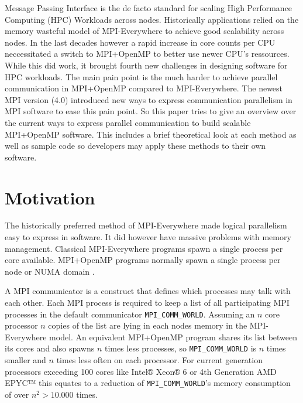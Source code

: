 \documentclass[sigconf]{acmart}
\begin{document}
Message Passing Interface is the de facto standard for scaling High Performance Computing (HPC) Workloads across nodes.
Historically applications relied on the memory wasteful model of MPI-Everywhere to achieve good scalability across nodes.
In the last decades however a rapid increase in core counts per CPU neccessitated a switch to MPI+OpenMP to better use newer CPU's ressources.
While this did work, it brought fourth new challenges in designing software for HPC workloads.
The main pain point is the much harder to achieve parallel communication in MPI+OpenMP compared to MPI-Everywhere.
The newest MPI version (4.0) introduced new ways to express communication parallelism in MPI software to ease this pain point.
So this paper tries to give an overview over the current ways to express parallel communication to build scalable MPI+OpenMP software.
This includes a brief theoretical look at each method as well as sample code so developers may apply these methods to their own software.



\section{Motivation}
The historically preferred method of MPI-Everywhere made logical parallelism easy to express in software.
It did however have massive problems with memory management.
Classical MPI-Everywhere programs spawn a single process per core available.
MPI+OpenMP programs normally spawn a single process per node or NUMA domain \cite{zambreLessonsLearned2022}.

A MPI communicator is a construct that defines which processes may talk with each other.
Each MPI process is required to keep a list of all participating MPI processes in the default communicator \verb|MPI_COMM_WORLD|.
Assuming an $n$ core processor $n$ copies of the list are lying in each nodes memory in the MPI-Everywhere model.
An equivalent MPI+OpenMP program shares its list between its cores and also spawns $n$ times less processes, so \verb|MPI_COMM_WORLD| is $n$ times smaller and $n$ times less often on each processor.
For current generation processors exceeding 100 cores like Intel® Xeon® 6 \cite{intelXeon6} or 4th Generation AMD EPYC™ \cite{amd4thGenEpyc} this equates to a reduction of \verb|MPI_COMM_WORLD|'s memory consumption of over $n^2 > 10.000$ times.
\end{document}
